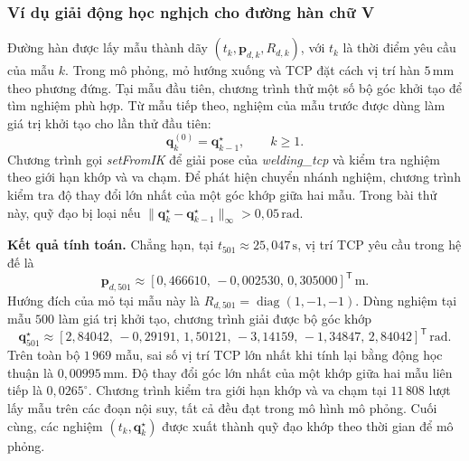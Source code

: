 \subsubsection*{Ví dụ giải động học nghịch cho đường hàn chữ V}
Đường hàn được lấy mẫu thành dãy \((t_k,\mathbf p_{d,k},R_{d,k})\), với \(t_k\) là thời điểm yêu cầu của mẫu \(k\). Trong mô phỏng, mỏ hướng xuống và TCP đặt cách vị trí hàn \(5\,\mathrm{mm}\) theo phương đứng. Tại mẫu đầu tiên, chương trình thử một số bộ góc khởi tạo để tìm nghiệm phù hợp. Từ mẫu tiếp theo, nghiệm của mẫu trước được dùng làm giá trị khởi tạo cho lần thử đầu tiên:
\[
  \mathbf q_k^{(0)}=\mathbf q_{k-1}^{\star},\qquad k\geq 1.
\]
Chương trình gọi \textit{setFromIK} để giải pose của \textit{welding\_tcp} và kiểm tra nghiệm theo giới hạn khớp và va chạm. Để phát hiện chuyển nhánh nghiệm, chương trình kiểm tra độ thay đổi lớn nhất của một góc khớp giữa hai mẫu. Trong bài thử này, quỹ đạo bị loại nếu \(\|\mathbf q_k^\star-\mathbf q_{k-1}^\star\|_\infty > 0{,}05\,\mathrm{rad}\).

\noindent\textbf{Kết quả tính toán.}
Chẳng hạn, tại \(t_{501}\approx25{,}047\,\mathrm{s}\), vị trí TCP yêu cầu trong hệ đế là
\[
  \mathbf p_{d,501}\approx
    [0{,}466610,\,-0{,}002530,\,0{,}305000]^{\mathsf T}\,\mathrm{m}.
\]
Hướng đích của mỏ tại mẫu này là \(R_{d,501}=\operatorname{diag}(1,-1,-1)\). Dùng nghiệm tại mẫu \(500\) làm giá trị khởi tạo, chương trình giải được bộ góc khớp
\[
  \mathbf q_{501}^{\star}\approx
    [2{,}84042,\,-0{,}29191,\,1{,}50121,\,-3{,}14159,\,-1{,}34847,\,2{,}84042]^{\mathsf T}
    \,\mathrm{rad}.
\]
Trên toàn bộ \(1\,969\) mẫu, sai số vị trí TCP lớn nhất khi tính lại bằng động học thuận là \(0{,}00995\,\mathrm{mm}\). Độ thay đổi góc lớn nhất của một khớp giữa hai mẫu liên tiếp là \(0{,}0265^\circ\). Chương trình kiểm tra giới hạn khớp và va chạm tại \(11\,808\) lượt lấy mẫu trên các đoạn nội suy, tất cả đều đạt trong mô hình mô phỏng. Cuối cùng, các nghiệm \((t_k,\mathbf q_k^\star)\) được xuất thành quỹ đạo khớp theo thời gian để mô phỏng.

